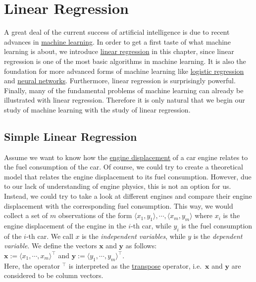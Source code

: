 \chapter{Linear Regression}
A great deal of the current success of artificial intelligence is due to recent advances in
\href{https://en.wikipedia.org/wiki/Machine_learning}{machine learning}.  
In order to get a first taste of what machine learning is about, we introduce 
\href{https://en.wikipedia.org/wiki/Linear_regression}{linear regression} in this chapter, since linear regression
is one of the most basic algorithms in machine learning.  It is also the foundation for more advanced
forms of machine learning like \href{https://en.wikipedia.org/wiki/Logistic_regression}{logistic regression} and 
\href{https://en.wikipedia.org/wiki/Artificial_neural_network}{neural networks}.
Furthermore, linear regression is surprisingly powerful.  Finally, many of the fundamental problems of machine
learning can already be illustrated with linear regression.  Therefore it is only natural that we begin our
study of machine learning with the study of linear regression.

\section{Simple Linear Regression}
Assume we want to know how the \href{https://en.wikipedia.org/wiki/Engine_displacement}{engine displacement} of
a car engine relates to the fuel consumption of the car.  Of course, we could try to create a theoretical model that
relates the engine displacement to its fuel consumption.  However, due to our lack of understanding of engine
physics, this is not an option for us.  Instead, we could try to take a look at different engines and compare
their engine displacement with the corresponding fuel consumption.  This way, we would collect a set of  
$m$ observations of the form $\langle x_1, y_1\rangle, \cdots, \langle x_m, y_m\rangle$ 
where $x_i$ is the engine displacement of the engine in the $i$-th car, while $y_i$ is the fuel consumption of the
$i$-th car.  We call $x$ is the \emph{\color{blue}independent variables}, while $y$ is the 
\emph{\color{blue}dependent variable}.  We define the vectors $\mathbf{x}$ and $\mathbf{y}$ as follows:
\\[0.2cm]
\hspace*{1.3cm}
$\mathbf{x} := \langle x_1, \cdots, x_m \rangle^\top$ \quad and \quad
$\mathbf{y} := \langle y_1, \cdots, y_m \rangle^\top$.
\\[0.2cm]
Here, the operator $^\top$ is interpreted as the \href{https://en.wikipedia.org/wiki/Transpose}{transpose} operator,
i.e.~$\mathbf{x}$ and $\mathbf{y}$ are considered to be column vectors.

